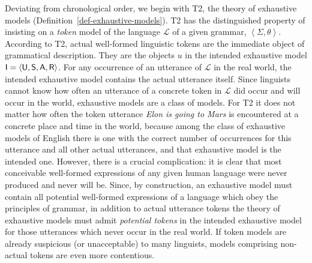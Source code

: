 \documentclass[output=paper
                ,modfonts
                ,nonflat
	        ,collection
	        ,collectionchapter
	        ,collectiontoclongg
 	        ,biblatex
                ,babelshorthands
                ,newtxmath
                ,draftmode
                ,colorlinks, citecolor=brown
]{./langsci/langscibook}
\begin{document}
{{Deviating from chronological order, we begin with T2, the theory of
exhaustive models (Definition~\ref{def-exhaustive-models}). T2 has the
distinguished property of insisting on a \emph{token} model of the
language $\mathcal{L}$ of a given grammar, $\left< \Sigma,
\theta\right>$.  According to T2, actual well-formed linguistic tokens
are the immediate object of grammatical description. They are the
objects $u$ in the intended exhaustive model $\mathsf{I} =
\langle\mathsf{U},\mathsf{S},\mathsf{A},\mathsf{R}\rangle$.  For any occurrence of an utterance of $\mathcal{L}$
in the real world, the intended exhaustive model contains the actual
utterance itself.  Since linguists cannot know how often an utterance
of a concrete token in $\mathcal{L}$ did occur and will occur in the
world, exhaustive models are a class of models. For T2 it does not
matter how often the token utterance {\em Elon is going to Mars} is
encountered at a concrete place and time in the world, because among
the class of exhaustive models of English there is one with the
correct number of occurrences for this utterance and all other actual
utterances, and that exhaustive model is the intended one. However,
there is a crucial complication: it is clear that most conceivable
well-formed expressions of any given human language were never
produced and never will be. Since, by construction, an exhaustive
model must contain all potential well-formed expressions of a language
which obey the principles of grammar, in addition to actual utterance
tokens the theory of exhaustive models must admit \emph{potential
  tokens} in the intended exhaustive model for those utterances which
never occur in the real world. If token models are already suspicious
(or unacceptable) to many linguists, models comprising non-actual
tokens are even more contentious.


}}
\end{document}
